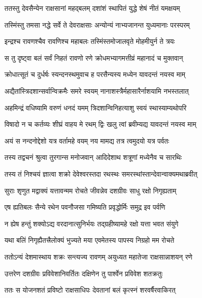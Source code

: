 \twolineshloka
{ततस्तु देवसैन्येन राक्षसानां महद्बलम्}
{दशांशं स्थापितं युद्धे शेषं नीतं यमक्षयम्} %

\twolineshloka
{तस्मिंस्तु तमसा नद्धे सर्वे ते देवराक्षसाः}
{अन्योन्यं नाभ्यजानन्त युध्यमानाः परस्परम्} %

\twolineshloka
{इन्द्रश्च रावणश्चैव रावणिश्च महाबलः}
{तस्मिंस्तमोजालवृते मोहमीयुर्न ते त्रयः} %

\twolineshloka
{स तु दृष्ट्वा बलं सर्वं निहतं रावणो रणे}
{क्रोधमभ्यागमत्तीव्रं महानादं च मुक्तवान्} %

\twolineshloka
{क्रोधात्सूतं च दुर्धर्षः स्यन्दनस्थमुवाच ह}
{परसैन्यस्य मध्येन यावदन्तं नयस्व माम्} %

\twolineshloka
{अद्यैतांस्त्रिदशान्सर्वान्विक्रमैः समरे स्वयम्}
{नानाशस्त्रैर्महासारैर्नाशयामि नभस्तलात्} %

\twolineshloka
{अहमिन्द्रं वधिष्यामि वरुणं धनदं यमम्}
{त्रिदशान्विनिहत्याशु स्वयं स्थास्याम्यथोपरि} %

\twolineshloka
{विषादो न च कर्तव्यः शीघ्रं वाहय मे रथम्}
{द्विः खलु त्वां ब्रवीम्यद्य यावदन्तं नयस्व माम्} %

\twolineshloka
{अयं स नन्दनोद्देशो यत्र वर्तामहे वयम्}
{नय मामद्य तत्र त्वमुदयो यत्र पर्वतः} %

\twolineshloka
{तस्य तद्वचनं श्रुत्वा तुरगान्स मनोजवान्}
{आदिदेशाथ शत्रूणां मध्येनैव च सारथिः} %

\twolineshloka
{तस्य तं निश्चयं ज्ञात्वा शक्रो देवेश्वरस्तदा}
{रथस्थः समरस्थांस्तान्देवान्वाक्यमथाब्रवीत्} %

\twolineshloka
{सुराः शृणुत मद्वाक्यं यत्तावन्मम रोचते}
{जीवन्नेव दशग्रीवः साधु रक्षो निगृह्यताम्} %

\twolineshloka
{एष ह्यतिबलः सैन्ये रथेन पवनौजसा}
{गमिष्यति प्रवृद्धोर्मिः समुद्र इव पर्वणि} %

\twolineshloka
{न ह्येष हन्तुं शक्योऽद्य वरदानात्सुनिर्भयः}
{तद्ग्रहीष्यामहे रक्षो यत्ता भवत संयुगे} %

\twolineshloka
{यथा बलिं निगृह्यैतत्त्रैलोक्यं भुज्यते मया}
{एवमेतस्य पापस्य निग्रहो मम रोचते} %

\twolineshloka
{ततोऽन्यं देशमास्थाय शक्रः सन्त्यज्य रावणम्}
{अयुध्यत महातेजा राक्षसान्नाशयन् रणे} %

\twolineshloka
{उत्तरेण दशग्रीवः प्रविवेशानिवर्तितः}
{दक्षिणेन तु पार्श्वेन प्रविवेश शतक्रतुः} %

\twolineshloka
{ततः स योजनशतं प्रविष्टो राक्षसाधिपः}
{देवतानां बलं कृत्स्नं शरवर्षैरवाकिरत्} %

